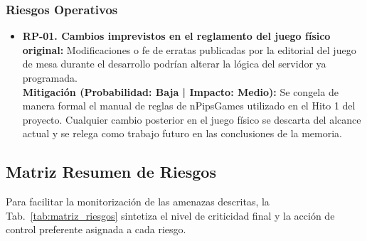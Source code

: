 \subsubsection{Riesgos Operativos}

\begin{itemize}
    \item \textbf{RP-01. Cambios imprevistos en el reglamento del juego físico original:} Modificaciones o fe de erratas publicadas por la editorial del juego de mesa durante el desarrollo podrían alterar la lógica del servidor ya programada. \\
    \textbf{Mitigación (Probabilidad: Baja | Impacto: Medio):} Se congela de manera formal el manual de reglas de nPipsGames utilizado en el Hito 1 del proyecto. Cualquier cambio posterior en el juego físico se descarta del alcance actual y se relega como trabajo futuro en las conclusiones de la memoria.
\end{itemize}

\subsection{Matriz Resumen de Riesgos}

Para facilitar la monitorización de las amenazas descritas, la Tab.~\ref{tab:matriz_riesgos} sintetiza el nivel de criticidad final y la acción de control preferente asignada a cada riesgo.


